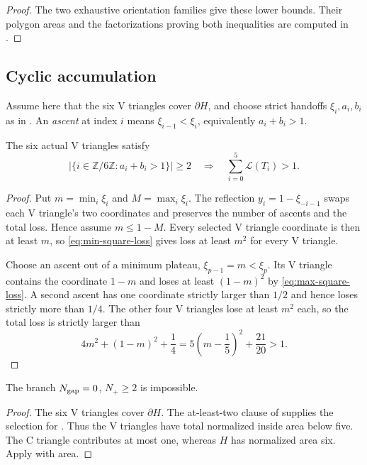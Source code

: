 \begin{proof}
The two exhaustive orientation families give these lower bounds.  Their polygon
areas and the factorizations proving both inequalities are computed in
.
\end{proof}

\subsection{Cyclic accumulation}

Assume here that the six V triangles cover $\partial H$, and choose
strict handoffs $\xi_i,a_i,b_i$ as in .
An \emph{ascent} at index $i$ means $\xi_{i-1}<\xi_i$, equivalently
$a_i+b_i>1$.

\begin{lemma}
\label{lem:cyclic-area-loss}
The six actual V triangles satisfy
\[
 \left|\{i\in\mathbb Z/6\mathbb Z:a_i+b_i>1\}\right|\ge2
 \quad\Longrightarrow\quad
 \sum_{i=0}^5\mathcal L(T_i)>1.
\]
\end{lemma}

\begin{proof}
Put $m=\min_i \xi_i$ and $M=\max_i \xi_i$.  The reflection
$y_i=1-\xi_{-i-1}$ swaps each V triangle's two coordinates and preserves the number of ascents and the total loss.  Hence assume $m\le1-M$.  Every selected
V triangle coordinate is then at least $m$, so
\eqref{eq:min-square-loss} gives loss at least $m^2$ for every V triangle.

Choose an ascent out of a minimum plateau,
$\xi_{p-1}=m<\xi_p$.  Its V triangle contains the coordinate $1-m$ and loses at least
$(1-m)^2$ by \eqref{eq:max-square-loss}.  A second ascent has one coordinate
strictly larger than $1/2$ and hence loses strictly more than $1/4$.  The
other four V triangles lose at least $m^2$ each, so the total loss is strictly
larger than
\[
 4m^2+(1-m)^2+\frac14
 =5\left(m-\frac15\right)^2+\frac{21}{20}>1.
\]

\end{proof}

\begin{proposition}
\label{prop:area-branches}
The branch $N_{\rm gap}=0$, $N_+\ge2$ is impossible.
\end{proposition}
\begin{proof}
The six V triangles cover $\partial H$. The at-least-two clause of
 supplies the selection for
. Thus the V triangles have total normalized
inside area below five. The C triangle contributes at most one, whereas
$H$ has normalized area six. Apply  with area.
\end{proof}
